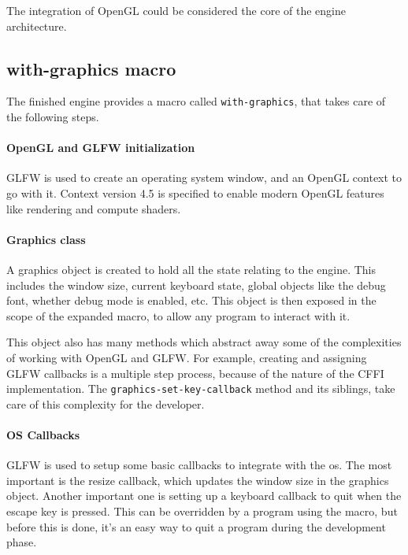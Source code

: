 
The integration of OpenGL could be considered the core of the engine architecture.

\subsection{with-graphics macro}

The finished engine provides a macro called \texttt{with-graphics},
that takes care of the following steps.

\paragraph{OpenGL and GLFW initialization}

GLFW is used to create an operating system window,
and an OpenGL context to go with it.
Context version 4.5 is specified to enable modern OpenGL features like rendering and compute shaders.

\paragraph{Graphics class}

A graphics object is created to hold all the state relating to the engine.
This includes the window size,
current keyboard state,
global objects like the debug font,
whether debug mode is enabled,
etc.
This object is then exposed in the scope of the expanded macro,
to allow any program to interact with it.

This object also has many methods which abstract away some of the complexities of working with OpenGL and GLFW.
For example,
creating and assigning GLFW callbacks is a multiple step process,
because of the nature of the CFFI implementation.
The \texttt{graphics-set-key-callback} method and its siblings,
take care of this complexity for the developer.

\paragraph{OS Callbacks}

GLFW is used to setup some basic callbacks to integrate with the \ac{os}.
The most important is the resize callback,
which updates the window size in the graphics object.
Another important one is setting up a keyboard callback to quit when the escape key is pressed.
This can be overridden by a program using the macro,
but before this is done,
it's an easy way to quit a program during the development phase.

